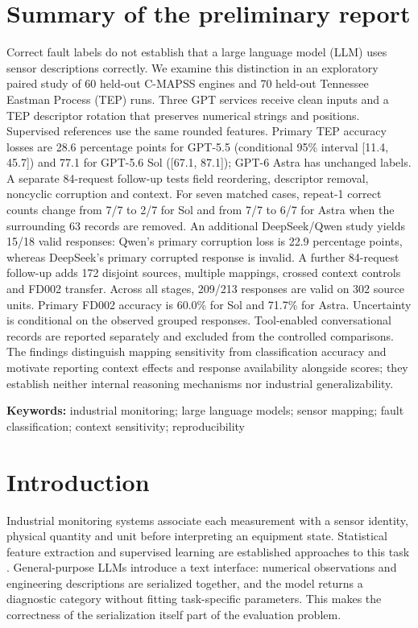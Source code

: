 \documentclass[11pt,a4paper]{article}
\begin{document}
\section*{Summary of the preliminary report}
Correct fault labels do not establish that a large language model (LLM) uses sensor descriptions correctly. We examine this distinction in an exploratory paired study of 60 held-out C-MAPSS engines and 70 held-out Tennessee Eastman Process (TEP) runs. Three GPT services receive clean inputs and a TEP descriptor rotation that preserves numerical strings and positions. Supervised references use the same rounded features. Primary TEP accuracy losses are 28.6 percentage points for GPT-5.5 (conditional 95\% interval [11.4, 45.7]) and 77.1 for GPT-5.6 Sol ([67.1, 87.1]); GPT-6 Astra has unchanged labels. A separate 84-request follow-up tests field reordering, descriptor removal, noncyclic corruption and context. For seven matched cases, repeat-1 correct counts change from 7/7 to 2/7 for Sol and from 7/7 to 6/7 for Astra when the surrounding 63 records are removed. An additional DeepSeek/Qwen study yields 15/18 valid responses: Qwen's primary corruption loss is 22.9 percentage points, whereas DeepSeek's primary corrupted response is invalid. A further 84-request follow-up adds 172 disjoint sources, multiple mappings, crossed context controls and FD002 transfer. Across all stages, 209/213 responses are valid on 302 source units. Primary FD002 accuracy is 60.0\% for Sol and 71.7\% for Astra. Uncertainty is conditional on the observed grouped responses. Tool-enabled conversational records are reported separately and excluded from the controlled comparisons. The findings distinguish mapping sensitivity from classification accuracy and motivate reporting context effects and response availability alongside scores; they establish neither internal reasoning mechanisms nor industrial generalizability.

\noindent\textbf{Keywords:} industrial monitoring; large language models; sensor mapping; fault classification; context sensitivity; reproducibility

\section{Introduction}
Industrial monitoring systems associate each measurement with a sensor identity, physical quantity and unit before interpreting an equipment state. Statistical feature extraction and supervised learning are established approaches to this task \citep{lei2020applications,zhao2019deep}. General-purpose LLMs introduce a text interface: numerical observations and engineering descriptions are serialized together, and the model returns a diagnostic category without fitting task-specific parameters. This makes the correctness of the serialization itself part of the evaluation problem.
\end{document}

